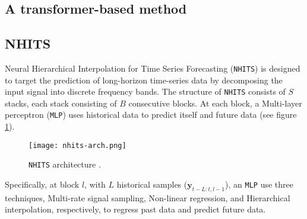 \subsection{A transformer-based method}


\subsection{NHITS}


Neural Hierarchical Interpolation for Time Series Forecasting (\verb|NHITS|) \cite{challu2023nhits} is designed to target the prediction of long-horizon time-series data by decomposing the input signal into discrete frequency bands. The structure of \verb|NHITS| consists of $S$ stacks, each stack consisting of $B$ consecutive blocks. At each block, a Multi-layer perceptron (\verb|MLP|) uses historical data to predict itself and future data (see figure \ref{fig:nhits}).

\begin{figure}[H]
    \centering
    \texttt{[image: nhits-arch.png]}
    \cprotect\caption{\verb|NHITS| architecture \cite{challu2023nhits}.}
    \label{fig:nhits}
\end{figure}


Specifically, at block $l$, with $L$ historical samples ($\mathbf{y}_{t-L:t, l-1}$), an \verb|MLP| use three techniques, Multi-rate signal sampling, Non-linear regression, and Hierarchical interpolation, respectively, to regress past data and predict future data.


